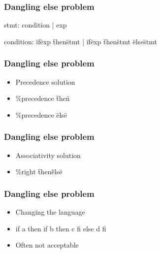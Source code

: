 \begin{frame}
  \frametitle{Dangling else problem}
    stmt:
      condition
    | exp

    condition:
      \"if\" exp \"then\" stmt
    | \"if\" exp \"then\" stmt \"else\" stmt
\end{frame}

\begin{frame}
  \frametitle{Dangling else problem}
    \begin{itemize}[<+->]
      \item Precedence solution
      \item \%precedence \"then\"
      \item \%precedence \"else\"
    \end{itemize}
\end{frame}

\begin{frame}
  \frametitle{Dangling else problem}
    \begin{itemize}[<+->]
      \item Associativity solution
      \item \%right \"then\" \"else\"
    \end{itemize}
\end{frame}

\begin{frame}
  \frametitle{Dangling else problem}
    \begin{itemize}[<+->]
      \item Changing the language
      \item if a then if b then c fi else d fi
      \item Often not acceptable
    \end{itemize}
\end{frame}
